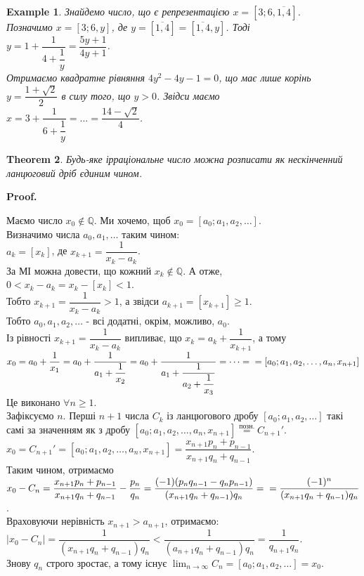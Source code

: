 \documentclass[a4paper, 14pt]{extarticle}
\makeatletter
\theoremstyle{theoremdd}
\newtheorem{theorem}{Theorem}[subsection]
\theoremstyle{theoremdd}
\theoremstyle{theoremdd}
\theoremstyle{theoremdd}
\newtheorem{example}[theorem]{Example}
\theoremstyle{theoremdd}
\theoremstyle{theoremdd}
\theoremstyle{theoremdd}
\theoremstyle{theoremdd}
\def\qed{$\blacksquare$}
\renewenvironment{proof}[1][Proof.\\]{\par
\pushQED{\hfill \qed}%
\normalfont \topsep6\p@\@plus6\p@\relax
\trivlist
\item\relax
{\bfseries
#1\@addpunct{.}}\hspace\labelsep\ignorespaces
}{%
\popQED\endtrivlist\@endpefalse
}
\makeatother
\begin{document}
\begin{example}
Знайдемо число, що є репрезентацією $x = [3;6,\overline{1,4}]$.\\
Позначимо $x = [3;6,y]$, де $y = [\overline{1,4}] = [\overline{1,4},y]$. Тоді \\
$y = 1 + \dfrac{1}{4+\dfrac{1}{y}} = \dfrac{5y+1}{4y+1}$.\\
Отримаємо квадратне рівняння $4y^2-4y-1=0$, що має лише корінь $y = \dfrac{1+\sqrt{2}}{2}$ в силу того, що $y > 0$. Звідси маємо\\
$x = 3 + \dfrac{1}{6 + \dfrac{1}{y}} = \dots = \dfrac{14-\sqrt{2}}{4}$.
\end{example}

\begin{theorem}
Будь-яке ірраціональне число можна розписати як нескінченний ланцюговий дріб єдиним чином.
\end{theorem}

\begin{proof}
Маємо число $x_0 \not\in \mathbb{Q}$. Ми хочемо, щоб $x_0 = [a_0;a_1,a_2,\dots]$.\\
Визначимо числа $a_0,a_1,\dots$ таким чином:\\
$a_k = [x_k]$, де $x_{k+1} = \dfrac{1}{x_k - a_k}$.\\
За МІ можна довести, що кожний $x_k \not\in \mathbb{Q}$. А отже, \\ $0 < x_k-a_k = x_k - [x_k] < 1$.\\
Тобто $x_{k+1} = \dfrac{1}{x_k-a_k} > 1$, а звідси $a_{k+1} = [x_{k+1}] \geq 1$.\\
Тобто $a_0, a_1,a_2,\dots$ - всі додатні, окрім, можливо, $a_0$.\\
Із рівності $x_{k+1} = \dfrac{1}{x_k-a_k}$ випливає, що $x_k = a_k + \dfrac{1}{x_{k+1}}$, а тому\\
$x_0 = a_0 + \dfrac{1}{x_1} = a_0 + \dfrac{1}{a_1 + \dfrac{1}{x_2}} = a_0 + \dfrac{1}{a_1 + \dfrac{1}{a_2 + \dfrac{1}{x_3}}} = \dots = \\ = [a_0;a_1,a_2,\dots,a_n,x_{n+1}]$\\
Це виконано $\forall n \geq 1$.\\
Зафіксуємо $n$. Перші $n+1$ числа $C_k$ із ланцюгового дробу $[a_0;a_1,a_2,\dots]$ такі самі за значенням як з дробу $[a_0;a_1,a_2,\dots,a_n,x_{n+1}] \overset{\text{позн.}}{=} C_{n+1}'$.\\
$x_0 = C_{n+1}' = [a_0;a_1,a_2,\dots,a_n,x_{n+1}] = \dfrac{x_{n+1}p_n + p_{n-1}}{x_{n+1}q_n+ q_{n-1}}$.\\
Таким чином, отримаємо\\
$x_0 - C_n = \dfrac{x_{n+1}p_n + p_{n-1}}{x_{n+1}q_n + q_{n-1}} - \dfrac{p_n}{q_n} = \dfrac{(-1)(p_nq_{n-1}-q_n p_{n-1})}{(x_{n+1}q_n+q_{n-1})q_n} = \\ = \dfrac{(-1)^n}{(x_{n+1}q_n+q_{n-1})q_n}$.\\
Враховуючи нерівність $x_{n+1} > a_{n+1}$, отримаємо:\\
$|x_0-C_n| = \dfrac{1}{(x_{n+1}q_n+q_{n-1})q_n} < \dfrac{1}{(a_{n+1}q_n + q_{n-1})q_n} = \dfrac{1}{q_{n+1}q_n}$.\\
Знову $q_n$ строго зростає, а тому існує $\displaystyle\lim_{n \to \infty} C_n = [a_0;a_1,a_2,\dots] = x_0$.
\end{proof}
\end{document}
